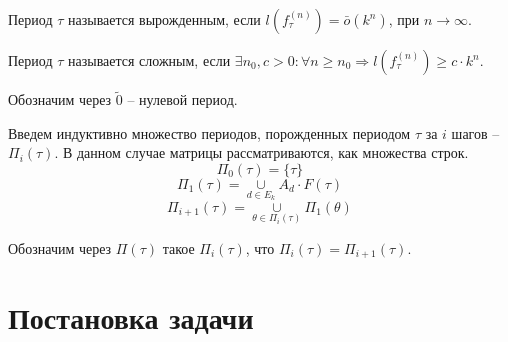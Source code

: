 \documentclass[bibliography=totoc, a4paper, 14pt]{extarticle}
\let\stdsection\section
\renewcommand\section{\newpage\stdsection}
\begin{document}
Период $\tau$ называется вырожденным, если $l(f_{\tau}^{(n)}) = \bar{o}(k^n)$, при $n\rightarrow\infty$.

Период $\tau$ называется сложным, если
$\exists n_0, c > 0 : \forall n \geqslant n_0 \Rightarrow l(f_{\tau}^{(n)}) \geqslant c \cdot k^n$.

Обозначим через $\tilde{0}$ -- нулевой период.

Введем индуктивно множество периодов, порожденных периодом $\tau$ за $i$ шагов -- $\Pi_i(\tau)$.
В данном случае матрицы рассматриваются, как множества строк.
$$\Pi_0(\tau) = \{\tau\}$$
$$\Pi_1(\tau) = \underset{d \in E_k}{\cup} A_d \cdot F(\tau)$$
$$\Pi_{i+1}(\tau) = \underset{\theta \in \Pi_i(\tau)}{\cup} \Pi_1(\theta)$$

Обозначим через $\Pi(\tau)$ такое $\Pi_i(\tau)$, что $\Pi_i(\tau) = \Pi_{i+1}(\tau)$.



\section{Постановка задачи}
\end{document}
